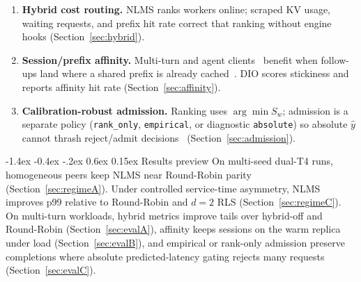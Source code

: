 \documentclass[pdflatex,sn-mathphys-num]{sn-jnl}
\makeatletter
\renewcommand{\subsection}{\@startsection{subsection}{2}{\z@}%
  {-1.4ex \@plus -0.4ex \@minus -.2ex}%
  {0.6ex \@plus 0.15ex}%
  {\needspace{3.5\baselineskip}\normalfont\normalsize\bfseries}}%
\makeatother
\begin{document}
\begin{enumerate}[label=(\Alph*),leftmargin=2em]
\item \textbf{Hybrid cost routing.} NLMS ranks workers online; scraped KV usage,
waiting requests, and prefix hit rate correct that ranking without engine hooks
(Section~\ref{sec:hybrid}).
\item \textbf{Session/prefix affinity.} Multi-turn and agent
clients~\cite{autogen,langgraph} benefit when follow-ups land where a shared
prefix is already cached~\cite{promptcache,hydragen,preble}. DIO scores stickiness
and reports affinity hit rate (Section~\ref{sec:affinity}).
\item \textbf{Calibration-robust admission.} Ranking uses $\arg\min S_w$; admission is a separate
policy (\texttt{rank\_only}, \texttt{empirical}, or diagnostic \texttt{absolute})
so absolute $\hat{y}$ cannot thrash reject/admit decisions~\cite{clockwork,distserve}
(Section~\ref{sec:admission}).
\end{enumerate}

\subsection{Results preview}
On multi-seed dual-T4 runs, homogeneous peers keep NLMS near Round-Robin parity
(Section~\ref{sec:regimeA}). Under controlled service-time asymmetry, NLMS improves
p99 relative to Round-Robin and $d{=}2$ RLS (Section~\ref{sec:regimeC}). On multi-turn
workloads, hybrid metrics improve tails over hybrid-off and Round-Robin
(Section~\ref{sec:evalA}), affinity keeps sessions on the warm replica under load
(Section~\ref{sec:evalB}), and empirical or rank-only admission preserve completions
where absolute predicted-latency gating rejects many requests
(Section~\ref{sec:evalC}).
\end{document}
